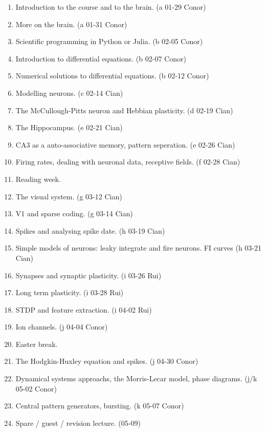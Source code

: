 \documentclass[11pt,a4paper]{scrartcl}
\begin{document}
\begin{enumerate}

\item Introduction to the course and to the brain. (a 01-29 Conor)
\item More on the brain. (a 01-31 Conor)

\item Scientific programming in Python or Julia. (b 02-05 Conor)
\item Introduction to differential equations. (b 02-07 Conor)

\item Numerical solutions to differential equations. (b 02-12 Conor)

\item Modelling neurons. (c 02-14 Cian)
\item The McCullough-Pitts neuron and Hebbian plasticity. (d 02-19 Cian)

\item The Hippocampus. (e 02-21 Cian)
\item CA3 as a auto-associative memory, pattern seperation. (e 02-26 Cian)

\item Firing rates, dealing with neuronal data, receptive fields. (f 02-28 Cian)

\item Reading week.
  
\item The visual system. (g 03-12 Cian)

\item V1 and sparse coding. (g 03-14 Cian)
\item Spikes and analysing spike date. (h 03-19 Cian)

\item Simple models of neurons: leaky integrate and fire neurons. FI curves (h 03-21 Cian)
\item Synapses and synaptic plasticity. (i 03-26 Rui)
\item Long term plasticity. (i 03-28 Rui)
\item STDP and feature extraction. (i 04-02 Rui)
\item Ion channels. (j 04-04 Conor)

\item Easter break.
  
\item The Hodgkin-Huxley equation and spikes. (j 04-30 Conor)
\item Dynamical systems approachs, the Morris-Lecar model, phase diagrams. (j/k 05-02 Conor)

\item Central pattern generators, bursting. (k 05-07 Conor)
\item Spare / guest / revision lecture. (05-09)

\end{enumerate}
\end{document}
